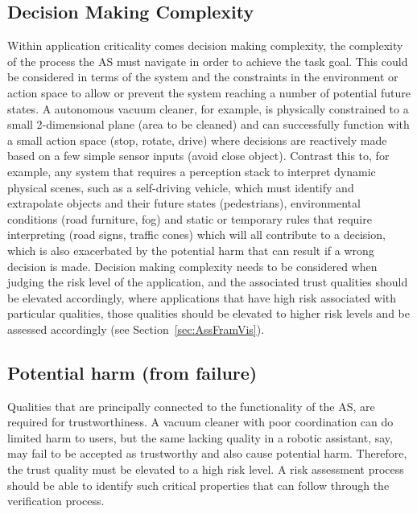 \subsection{Decision Making Complexity} \label{sec:appcrit-dec}

Within application criticality comes decision making complexity, the complexity of the process the AS must navigate in order to achieve the task goal. This could be considered in terms of the system and the constraints in the environment or action space to allow or prevent the system reaching a number of potential future states. A autonomous vacuum cleaner, for example, is physically constrained to a small 2-dimensional plane (area to be cleaned) and can successfully function with a small action space (stop, rotate, drive) where decisions are reactively made based on a few simple sensor inputs (avoid close object). 
%
Contrast this to, for example, any system that requires a perception stack to interpret dynamic physical scenes, such as a self-driving vehicle, which must identify and extrapolate objects and their future states (pedestrians), environmental conditions (road furniture, fog) and static or temporary rules that require interpreting (road signs, traffic cones) which will all contribute to a decision, which is also exacerbated by the potential harm that can result if a wrong decision is made. 
%
Decision making complexity needs to be considered when judging the risk level of the application, and the associated trust qualities should be elevated accordingly, where applications that have high risk associated with particular qualities, those qualities should be elevated to higher risk levels and be assessed accordingly (see Section~\ref{sec:AssFramVis}).  

\subsection{Potential harm (from failure)} \label{sec:app-harm}

Qualities that are principally connected to the functionality of the AS, are required for trustworthiness. A vacuum cleaner with poor coordination can do limited harm to users, but the same lacking quality in a robotic assistant, say, may fail to be accepted as trustworthy and also cause potential harm. Therefore, the trust quality must be elevated to a high risk level.
%
A risk assessment process should be able to identify such critical properties that can follow through the verification process. 


